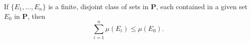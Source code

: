 If $\{E_1, \dots, E_n\}$ is a finite, disjoint class of sets in $\mathbf{P}$, each contained in a given set $E_0$ in $\mathbf{P}$, then
$$\sum_{i=1}^{n} \mu(E_i) \leq \mu(E_0).$$
